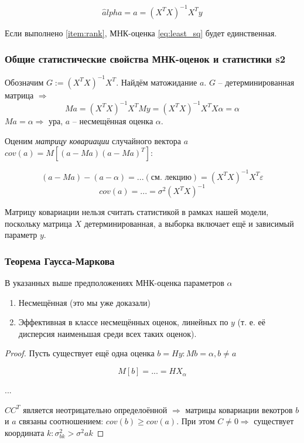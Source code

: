 \documentclass[main.tex]{subfiles}
\begin{document}
\begin{equation} \label{eq:least_sq}
    \hat alpha = a = (X^T X)^{-1} X^T y
\end{equation}

Если выполнено \ref{item:rank}, МНК-оценка \eqref{eq:least_sq} будет единственная.

\subsubsection{Общие статистические свойства МНК-оценок и статистики s2}

Обозначим $ G := (X^T X)^{-1} X^T $.
Найдём матожидание $a$. $ G $ -- детерминированная матрица $ \Rightarrow $
$$ Ma = (X^T X)^{-1} X^TMy = (X^T X)^{-1} X^T X \alpha = \alpha $$
$ Ma = \alpha \Rightarrow $ ура, $ a $ -- несмещённая оценка $ \alpha $.

Оценим \emph{матрицу ковариации} случайного вектора $a$ $ cov(a) = M[(a-Ma)(a-Ma)^T] $:

$$ (a-Ma) - (a-\alpha) = ... (\text{см. лекцию}) = (X^T X)^{-1} X^T \varepsilon $$
$$ cov(a) = ... = \sigma^2(X^T X)^{-1} $$

Матрицу ковариации нельзя считать статистикой в рамках нашей модели, поскольку матрица $ X $ детерминированная, а выборка включает ещё и зависимый параметр $ y $.

\subsubsection{Теорема Гаусса-Маркова}

\begin{theorem}
В указанных выше предположениях МНК-оценка параметров $ \alpha $

\begin{enumerate}[noitemsep]
    \item Несмещённая (это мы уже доказали)
    \item Эффективная в классе несмещённых оценок, линейных по $y$ (т. е. её дисперсия наименьшая среди всех таких оценок).
\end{enumerate}
\end{theorem}
\begin{proof}
Пусть существует ещё одна оценка $ b = Hy: Mb = \alpha, b \ne a $

$$ M[b]= ... =HX_{\alpha} $$

...

$ CC^T $ является неотрицательно определоённой $ \Rightarrow $ матрицы ковариации векотров $ b $ и $ a $ связаны соотношением: $ cov(b) \ge cov(a) $.
При этом $ C \ne 0 \Rightarrow $ существует координата $ k: \sigma^2_{bk} > \sigma^2{ak} $

\end{proof}
\end{document}
